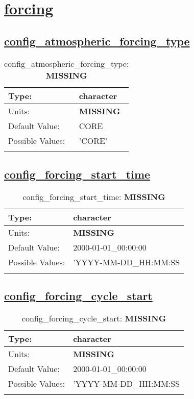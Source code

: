 \section[forcing]{\hyperref[sec:nm_tab_forcing]{forcing}}
\label{sec:nm_sec_forcing}
\subsection[config\_atmospheric\_forcing\_type]{\hyperref[sec:nm_tab_forcing]{config\_atmospheric\_forcing\_type}}
\label{subsec:nm_sec_config_atmospheric_forcing_type}
\begin{center}
\begin{longtable}{| p{2.0in} || p{4.0in} |}
    \hline
    Type: & character \\
    \hline
    Units: & {\bf \color{red} MISSING} \\
    \hline
    Default Value: & CORE \\
    \hline
    Possible Values: & 'CORE' \\
    \hline
    \caption{config\_atmospheric\_forcing\_type: {\bf \color{red} MISSING}}
\end{longtable}
\end{center}
\subsection[config\_forcing\_start\_time]{\hyperref[sec:nm_tab_forcing]{config\_forcing\_start\_time}}
\label{subsec:nm_sec_config_forcing_start_time}
\begin{center}
\begin{longtable}{| p{2.0in} || p{4.0in} |}
    \hline
    Type: & character \\
    \hline
    Units: & {\bf \color{red} MISSING} \\
    \hline
    Default Value: & 2000-01-01\_00:00:00 \\
    \hline
    Possible Values: & 'YYYY-MM-DD\_HH:MM:SS \\
    \hline
    \caption{config\_forcing\_start\_time: {\bf \color{red} MISSING}}
\end{longtable}
\end{center}
\subsection[config\_forcing\_cycle\_start]{\hyperref[sec:nm_tab_forcing]{config\_forcing\_cycle\_start}}
\label{subsec:nm_sec_config_forcing_cycle_start}
\begin{center}
\begin{longtable}{| p{2.0in} || p{4.0in} |}
    \hline
    Type: & character \\
    \hline
    Units: & {\bf \color{red} MISSING} \\
    \hline
    Default Value: & 2000-01-01\_00:00:00 \\
    \hline
    Possible Values: & 'YYYY-MM-DD\_HH:MM:SS \\
    \hline
    \caption{config\_forcing\_cycle\_start: {\bf \color{red} MISSING}}
\end{longtable}
\end{center}
